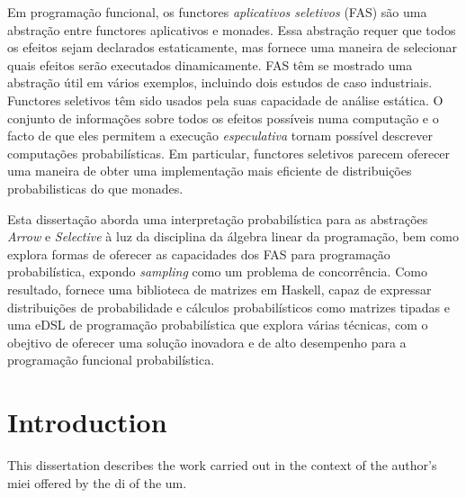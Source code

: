 \documentclass[
  oneside,
  11pt, a4paper,
  footinclude=true,
  headinclude=true,
  cleardoublepage=empty
]{scrbook}
\theoremstyle{definition}
\theoremstyle{definition}
\begin{document}
    
    Em programação funcional, os functores \emph{aplicativos seletivos} (FAS) são uma abstração entre functores aplicativos e monades. Essa abstração requer que todos os efeitos sejam declarados estaticamente, mas fornece uma maneira de selecionar quais efeitos serão executados dinamicamente. FAS têm se mostrado uma abstração útil em vários exemplos, incluindo dois estudos de caso industriais. Functores seletivos têm sido usados pela suas capacidade de análise estática. O conjunto de informações sobre todos os efeitos possíveis numa computação e o facto de que eles permitem a execução \emph{especulativa} tornam possível descrever computações probabilísticas. Em particular, functores seletivos parecem oferecer uma maneira de obter uma implementação mais eficiente de distribuições probabilisticas do que monades.
        
    Esta dissertação aborda uma interpretação probabilística para as abstrações \emph{Arrow} e \emph{Selective} à luz da disciplina da álgebra linear da programação, bem como explora formas de oferecer as capacidades dos FAS para programação probabilística, expondo \emph{sampling} como um problema de concorrência. Como resultado, fornece uma biblioteca de matrizes em Haskell, capaz de expressar distribuições de probabilidade e cálculos probabilísticos como matrizes tipadas e uma eDSL de programação probabilística que explora várias técnicas, com o obejtivo de oferecer uma solução inovadora e de alto desempenho para a programação funcional probabilística.
	
	\vskip0.5cm
    
	\tableofcontents
	\listoffigures
	\listoftables
	\lstlistoflistings
    \renewcommand{\listtheoremname}{List of theorems and definitions}
	\printglossary[type=\acronymtype]
	\clearpage
	\thispagestyle{empty}

	
	\chapter{Introduction}
        This dissertation describes the work carried out in the context of the author's \gls{miei} offered by the \gls{di} of the \gls{um}.
        
\end{document}
